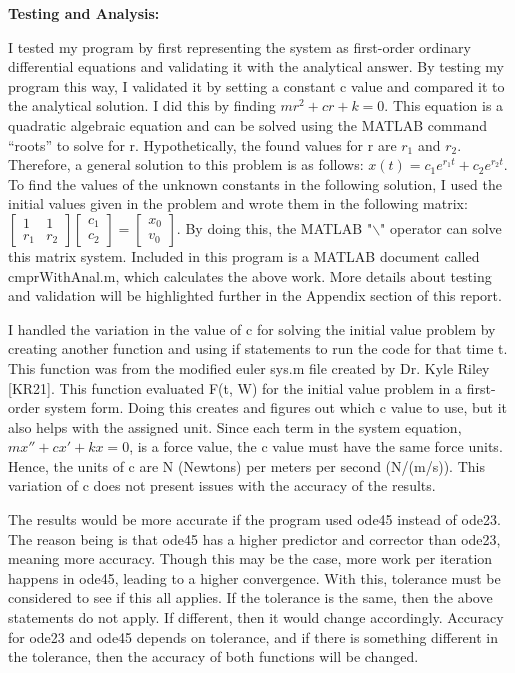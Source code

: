 \documentclass{article}
\begin{document}
{\bf Testing and Analysis:} {\color{black} I tested my program by first representing the system as first-order ordinary differential equations and validating it with the analytical answer.  By testing my program this way, I validated it by setting a constant c value and compared it to the analytical solution.  I did this by finding $mr^2+cr+k=0$.  This equation is a quadratic algebraic equation and can be solved using the MATLAB command “roots” to solve for r.  Hypothetically, the found values for r are $r_{1}$ and $r_{2}$. Therefore, a general solution to this problem is as follows: $x(t)=c_{1}e^{r_{1}t}+c_{2}e^{r_{2}t}$.  To find the values of the unknown constants in the following solution, I used the initial values given in the problem and wrote them in the following matrix: $\begin{bmatrix}
1 & 1\\ 
 r_{1}& r_{2} 
\end{bmatrix}
\begin{bmatrix}
c_{1}\\ 
c_{2}
\end{bmatrix}=\begin{bmatrix}
x_{0}\\ 
v_{0}
\end{bmatrix}$.  
By doing this, the MATLAB "$\backslash$" operator can solve this matrix system.  Included in this program is a MATLAB document called cmprWithAnal.m, which calculates the above work.  More details about testing and validation will be highlighted further in the Appendix section of this report.
\par \medskip \par
I handled the variation in the value of c for solving the initial value problem by creating another function and using if statements to run the code for that time t.  This function was from the modified \textunderscore euler  \textunderscore sys.m file created by Dr. Kyle Riley [KR21].  This function evaluated F(t, W) for the initial value problem in a first-order system form.  Doing this creates and figures out which c value to use, but it also helps with the assigned unit.  Since each term in the system equation, $mx''+cx'+kx=0$, is a force value, the c value must have the same force units.  Hence, the units of c are N (Newtons) per meters per second (N/(m/s)).
This variation of c does not present issues with the accuracy of the results.
\par \medskip \par
The results would be more accurate if the program used ode45 instead of ode23.  The reason being is that ode45 has a higher predictor and corrector than ode23, meaning more accuracy.  Though this may be the case, more work per iteration happens in ode45, leading to a higher convergence.  With this, tolerance must be considered to see if this all applies.  If the tolerance is the same, then the above statements do not apply.  If different, then it would change accordingly.  Accuracy for ode23 and ode45 depends on tolerance, and if there is something different in the tolerance, then the accuracy of both functions will be changed.
 
}
\end{document}
